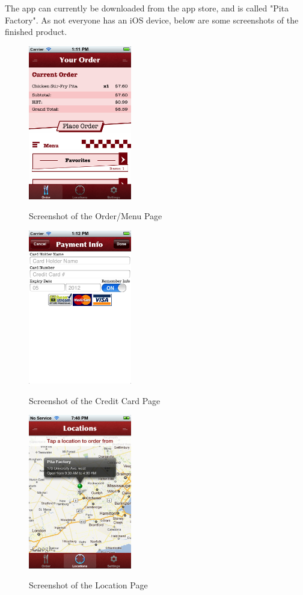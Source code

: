 \documentclass[se]{uw-wkrpt}
\begin{document}
The app can currently be downloaded from the app store, and is called "Pita Factory". As
not everyone has an iOS device, below are some screenshots of the finished product.

\begin{figure}[h!]
  \caption{Screenshot of the Order/Menu Page}
  \centering
    \includegraphics[width=0.4\textwidth]{orderMenuPage}
  \label{fig:Menu Page}
\end{figure}

\begin{figure}[h!]
  \caption{Screenshot of the Credit Card Page}
  \centering
    \includegraphics[width=0.4\textwidth]{creditCardPage}
  \label{fig:Credit Card Page}
\end{figure}

\begin{figure}[h!]
  \caption{Screenshot of the Location Page}
  \centering
    \includegraphics[width=0.4\textwidth]{locationPage}
  \label{fig:Location Pageg}
\end{figure}
\end{document}
